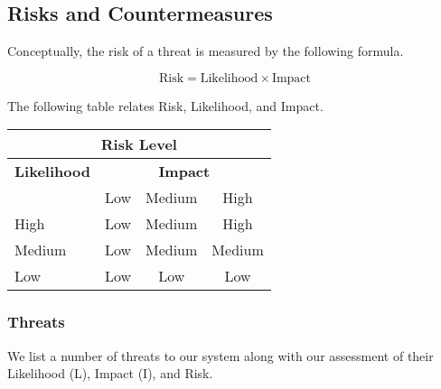 \documentclass{article}
\begin{document}


% 
% 

\subsection{Risks and Countermeasures}
Conceptually, the risk of a threat is measured by the following formula.

\begin{equation}
	\text{Risk} = \text{Likelihood} \times \text{Impact}
\end{equation}

The following table relates Risk, Likelihood, and Impact. 

\begin{center}
\begin{tabular}{|l|c|c|c|}
\hline
\multicolumn{4}{|c|}{{\bf Risk Level}} \\
\hline
{{\bf Likelihood}} & \multicolumn{3}{c|}{{\bf Impact}} \\ %
     & Low & Medium & High \\  \hline
 High & Low & Medium & High  \\
\hline
 Medium & Low & Medium & Medium \\
\hline
 Low & Low & Low & Low \\
\hline
\end{tabular}
\end{center}

\subsubsection{Threats}

We list a number of threats to our system along with our assessment of their Likelihood (L), Impact (I), and Risk.
\end{document}
